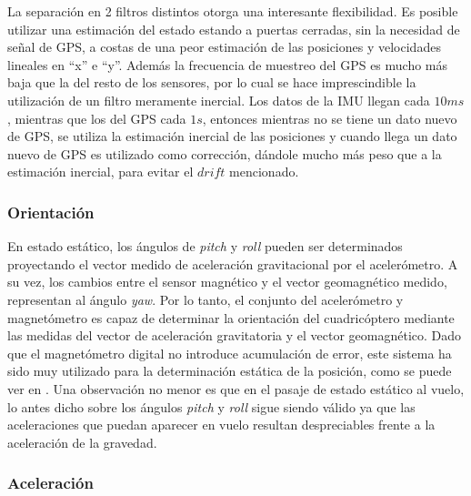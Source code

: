 \documentclass[main]{subfiles}
\begin{document}
La separación en 2 filtros distintos otorga una interesante flexibilidad. Es posible utilizar una estimación del estado estando a puertas cerradas, sin la necesidad de señal de GPS, a costas de una peor estimación de las posiciones y velocidades lineales en ``x'' e ``y''. Además la frecuencia de muestreo del GPS es mucho más baja que la del resto de los sensores, por lo cual se hace imprescindible la utilización de un filtro meramente inercial. Los datos de la IMU llegan cada $10ms$, mientras que los del GPS cada $1s$, entonces mientras no se tiene un dato nuevo de GPS, se utiliza la estimación inercial de las posiciones y cuando llega un dato nuevo de GPS es utilizado como corrección, dándole mucho más peso que a la estimación inercial, para evitar el $drift$ mencionado.

\subsubsection*{Orientación}

En estado estático, los ángulos de \emph{pitch} y \emph{roll} pueden ser determinados proyectando el vector medido de aceleración gravitacional por el acelerómetro. A su vez, los cambios entre el sensor magnético y el vector geomagnético medido, representan al ángulo \emph{yaw}. Por lo tanto, el conjunto del acelerómetro y magnetómetro es capaz de determinar la orientación del cuadricóptero mediante las medidas del vector de aceleración gravitatoria y el vector geomagnético. Dado que el magnetómetro digital no introduce acumulación de error, este sistema ha sido muy utilizado para la determinación estática de la posición, como se puede ver en \cite{bib:euler_magneto_acc}. Una observación no menor es que en el pasaje de estado estático al vuelo, lo antes dicho sobre los ángulos \emph{pitch} y \emph{roll} sigue siendo válido ya que las aceleraciones que puedan aparecer en vuelo resultan despreciables frente a la aceleración de la gravedad.

\subsubsection{Aceleración}
\end{document}
